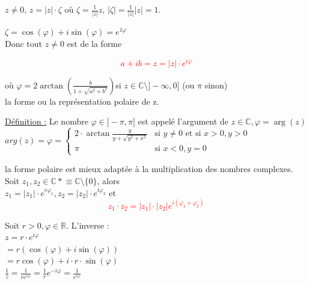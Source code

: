 \documentclass[12pt,a4paper]{article}
\newcommand{\R}{\ensuremath{\mathbb{R}} }
\begin{document}
{$z \neq 0$, $z = |z|\cdot\zeta$ où $\zeta = \frac{1}{|z|}z$, $|\zeta| = \frac{1}{|z|}|z| = 1$.

$\zeta = \cos(\varphi) + i\sin(\varphi) = e^{1\varphi}$\\
Donc tout $z \neq 0$ est de la forme 

\textcolor{red}{\begin{equation}
a+ib = z = |z| \cdot e^{i\varphi}
\end{equation}}

où $\varphi =2 \arctan(\frac{b}{1+\sqrt{a^2 + b^2}})$si $z \in \mathbb{C}\setminus ]-\infty, 0]$ (ou $\pi$ sinon)\\
la forme ou la représentation polaire de z.
\begin{boite}
\underline{Définition :} Le nombre $\varphi \in ]-\pi, \pi]$ est appelé l'argument de $z \in \mathbb{C}, \varphi = \arg(z)$\\
$arg(z)= \varphi= \left\{
    \begin{array}{lr}
        2\cdot \arctan\frac{y}{y+\sqrt{y^2+x^2}} & \mbox{si } y \neq 0 \mbox{ et si } x>0, y>0\\
        \pi & \mbox{si } x<0, y = 0
    \end{array}
\right.
$
\end{boite}

la forme polaire est mieux adaptée à la multiplication des nombres complexes. Soit $z_1, z_2 \in \mathbb{C*} \equiv \mathbb{C} \setminus \{0\}$, alors\\
$z_1 = |z_1|\cdot e^{e\varphi_1}, z_2 = |z_2|\cdot e^{i\varphi_2}$
et 
\textcolor{red}{\begin{equation}
z_1\cdot z_2 = |z_1|\cdot|z_2| e^{i(\varphi_1 + \varphi_2)}
\end{equation}}

Soit $r > 0, \varphi \in \R$. L'inverse :\\
$z = r\cdot e^{i\varphi}$\\
$= r (\cos(\varphi) + i\sin(\varphi))$\\
$= r\cos(\varphi) + i\cdot r \cdot \sin(\varphi)$\\

$\frac{1}{z} = \frac{1}{r e^{i\varphi}} = \frac{1}{r} e^{-i\varphi} = \frac{1}{e^{i\varphi}}$
}
\end{document}
